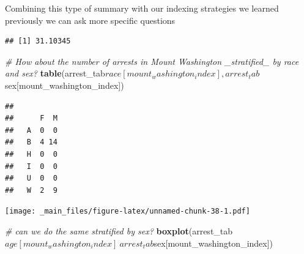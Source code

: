 \documentclass[]{article}
\newenvironment{Shaded}{\begin{snugshade}}{\end{snugshade}}
\newcommand{\KeywordTok}[1]{\textcolor[rgb]{0.13,0.29,0.53}{\textbf{{#1}}}}
\newcommand{\DataTypeTok}[1]{\textcolor[rgb]{0.13,0.29,0.53}{{#1}}}
\newcommand{\StringTok}[1]{\textcolor[rgb]{0.31,0.60,0.02}{{#1}}}
\newcommand{\CommentTok}[1]{\textcolor[rgb]{0.56,0.35,0.01}{\textit{{#1}}}}
\newcommand{\OtherTok}[1]{\textcolor[rgb]{0.56,0.35,0.01}{{#1}}}
\newcommand{\NormalTok}[1]{{#1}}
\theoremstyle{definition}
\theoremstyle{definition}
\theoremstyle{remark}
\begin{document}
Combining this type of summary with our indexing strategies we learned
previously we can ask more specific questions

\begin{Shaded}
\end{Shaded}

\begin{verbatim}
## [1] 31.10345
\end{verbatim}

\begin{Shaded}
\begin{Highlighting}[]
\CommentTok{# How about the number of arrests in Mount Washington _stratified_ by race and sex?}
\KeywordTok{table}\NormalTok{(arrest_tab$race[mount_washington_index], arrest_tab$sex[mount_washington_index])}
\end{Highlighting}
\end{Shaded}

\begin{verbatim}
##    
##      F  M
##   A  0  0
##   B  4 14
##   H  0  0
##   I  0  0
##   U  0  0
##   W  2  9
\end{verbatim}

\begin{Shaded}
\end{Shaded}

\texttt{[image: \_main\_files/figure-latex/unnamed-chunk-38-1.pdf]}

\begin{Shaded}
\begin{Highlighting}[]
\CommentTok{# can we do the same stratified by sex?}
\KeywordTok{boxplot}\NormalTok{(arrest_tab$age[mount_washington_index]~arrest_tab$sex[mount_washington_index])}
\end{Highlighting}
\end{Shaded}
\end{document}
